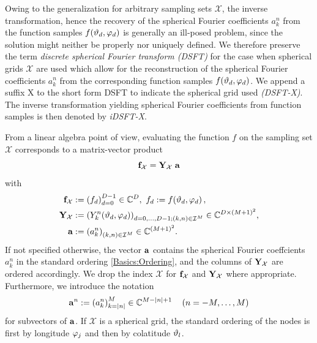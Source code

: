 Owing to the generalization for arbitrary 
sampling sets $\mathcal{X}$, the inverse transformation, hence
the recovery of the spherical Fourier coefficients 
$a_{k}^n$ from the function samples
$f{\hspace{-0.4ex}}\left(\vartheta_{d},\varphi_{d}\right)$ is generally an ill-posed problem, 
since the solution might neither be properly nor uniquely defined.
We therefore preserve the term \emph{discrete spherical Fourier transform (DSFT)} 
for the case when spherical grids $\mathcal{X}$ are used which allow for the 
reconstruction of the spherical Fourier coefficients $a_{k}^n$ from the corresponding 
function samples $f{\hspace{-0.4ex}}\left(\vartheta_{d},\varphi_{d}\right)$. We append a suffix X to the short form DSFT to indicate the spherical grid used \emph{(DSFT-X)}. The inverse transformation yielding
spherical Fourier coefficients from function samples is then denoted by \emph{iDSFT-X}.

From a linear algebra point of view, evaluating the function $f$ on the 
sampling set $\mathcal{X}$ corresponds to a matrix-vector product
\[ 
  \mathbf{f}_{\mathcal{X}} = \mathbf{Y}_{\mathcal{X}} \; \mathbf{a}
\]
with
\begin{equation}
  \nonumber
  \begin{split}
    \V{f}_{\mathcal{X}} & := \paren{f_d}_{d=0}^{D-1} \in \C^{D},\ f_{d} := \fun{f}{\vtheta_{d},\vphi_{d}},\\
    \V{Y}_{\mathcal{X}} & := \paren{\fun{Y_k^n}{\vtheta_d,\vphi_d}}_{d=0,\ldots,D-1; 
      \paren{k,n} \in \mathcal{I}^M} \in \C^{D \times \paren{M+1}^2},\\
    \V{a} & := \paren{a_k^n}_{\paren{k,n} \in \mathcal{I}^M} \in \C^{\paren{M+1}^2}.
  \end{split}
\end{equation}
If not specified otherwise, the vector $\mathbf{a}$ contains the spherical Fourier 
coeffcients $a_{k}^n$ in the 
standard ordering \eqref{Basics:Ordering}, and the columns of 
$\mathbf{Y}_{\mathcal{X}}$ are ordered accordingly. We drop the 
index $\mathcal{X}$ for $\mathbf{f}_{\mathcal{X}}$ and 
$\mathbf{Y}_{\mathcal{X}}$ where appropriate.
Furthermore, we introduce the notation
\begin{equation}
  \nonumber
  \mathbf{a}^{n} := \left(a_{k}^{n}\right)_{k=|n|}^{M} \in \mathbb{C}^{M-|n|+1} \quad \left(n=-M,\ldots,M\right)
\end{equation} 
for subvectors of $\mathbf{a}$. If $\mathcal{X}$ is a spherical grid, the standard ordering of the nodes is first by longitude $\varphi_{j}$ and then by 
colatitude $\vartheta_{l}$. 

